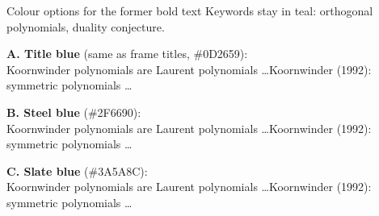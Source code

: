 \documentclass[10pt]{beamer}
\begin{document}
\begin{frame}{Colour options for the former bold text}
\small Keywords stay in teal: \textcolor{uiblink2}{orthogonal polynomials}, \textcolor{uiblink2}{duality conjecture}.
\bigskip

\textbf{A. Title blue} (same as frame titles, \#0D2659):\\
\textcolor{titleblue}{Koornwinder polynomials} are Laurent polynomials \dots\quad \textcolor{titleblue}{Koornwinder (1992):} symmetric polynomials \dots
\bigskip

\textbf{B. Steel blue} (\#2F6690):\\
\textcolor{steel}{Koornwinder polynomials} are Laurent polynomials \dots\quad \textcolor{steel}{Koornwinder (1992):} symmetric polynomials \dots
\bigskip

\textbf{C. Slate blue} (\#3A5A8C):\\
\textcolor{slate}{Koornwinder polynomials} are Laurent polynomials \dots\quad \textcolor{slate}{Koornwinder (1992):} symmetric polynomials \dots
\end{frame}
\end{document}
